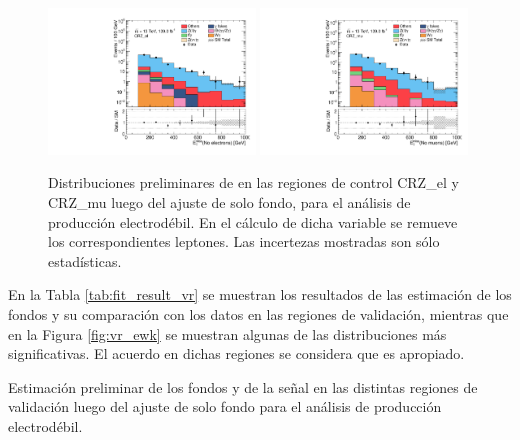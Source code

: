 \begin{figure}

\centering
    \includegraphics[width=0.49\textwidth]{images/analysis_EWK/v192_2_nosyst/can_CRZ_el_met_noele_et_afterFit.pdf}
    \includegraphics[width=0.49\textwidth]{images/analysis_EWK/v192_2_nosyst/can_CRZ_mu_met_nomuon_et_afterFit.pdf}

    \caption{Distribuciones preliminares de \met en las regiones de control CRZ\_el y CRZ\_mu luego del ajuste de solo fondo, para el análisis de producción electrodébil. En el cálculo de dicha variable se remueve los correspondientes leptones. Las incertezas mostradas son sólo estadísticas.}
    \label{fig:crz_el_mu_dist_ewk}
\end{figure}



En la Tabla \ref{tab:fit_result_vr} se muestran los resultados de las estimación de los fondos y su comparación con los datos en las regiones de validación, mientras que en la Figura \ref{fig:vr_ewk} se muestran algunas de las distribuciones más significativas. El acuerdo en dichas regiones se considera que es apropiado. 

\begin{table}[ht!]
  \centering
  \caption{Estimación preliminar de los fondos y de la señal en las distintas regiones de validación luego del ajuste de solo fondo para el análisis de producción electrodébil.}
  \resizebox{\textwidth}{!}{}
  \label{tab:fit_result_vr}
\end{table}


